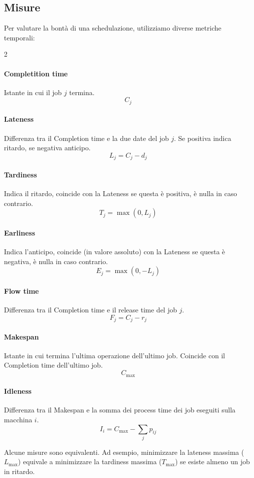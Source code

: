 %
\subsection{Misure}
Per valutare la bontà di una schedulazione, utilizziamo diverse metriche temporali:

\begin{multicols*}{2}
    \paragraph{Completition time} Istante in cui il job $ j $ termina.
    \[
        C_{j}
    \]

    \paragraph{Lateness} Differenza tra il Completion time e la due date del job $ j $. Se positiva indica ritardo, se negativa anticipo.
    \[
        L_{j}= C_{j} - d_{j}
    \]

    \paragraph{Tardiness} Indica il ritardo, coincide con la Lateness se questa è positiva, è nulla in caso contrario.
    \[
        T_{j} = \max(0,L_{j})
    \]

    \paragraph{Earliness} Indica l'anticipo, coincide (in valore assoluto) con la Lateness se questa è negativa, è nulla in caso contrario.
    \[
        E_{j} = \max(0,-L_{j})
    \]

    \paragraph{Flow time} Differenza tra il Completion time e il release time del job $ j $.
    \[
        F_{j} = C_{j}-r_{j}
    \]

    \paragraph{Makespan} Istante in cui termina l'ultima operazione dell'ultimo job. Coincide con il Completion time dell'ultimo job.
    \[
        C_{\max}
    \]

    \paragraph{Idleness} Differenza tra il Makespan e la somma dei process time dei job eseguiti sulla macchina $ i $.
    \[
        I_{i} = C_{\max}-\textstyle\sum_{j}p_{ij}
    \]

    \begin{note}
        Alcune misure sono equivalenti. Ad esempio, minimizzare la lateness massima ($ L_{\max} $) equivale a minimizzare la tardiness massima ($ T_{\max} $) se esiste almeno un job in ritardo.
    \end{note}
\end{multicols*}

